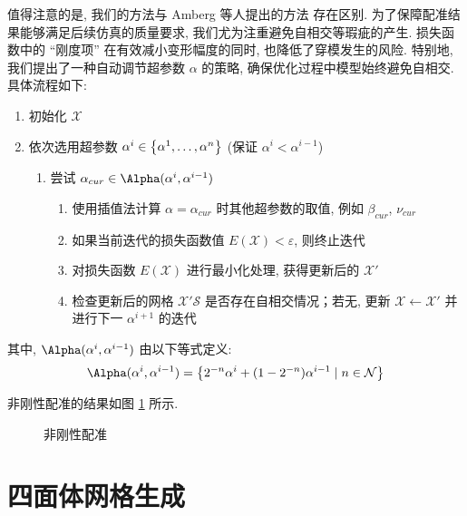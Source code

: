 值得注意的是, 我们的方法与 Amberg 等人提出的方法 \cite{ambergOptimalStepNonrigid2007} 存在区别.
为了保障配准结果能够满足后续仿真的质量要求, 我们尤为注重避免自相交等瑕疵的产生.
损失函数中的 ``刚度项'' 在有效减小变形幅度的同时, 也降低了穿模发生的风险.
特别地, 我们提出了一种自动调节超参数 $\alpha$ 的策略, 确保优化过程中模型始终避免自相交.
具体流程如下:
\begin{enumerate}
  \item 初始化 $\mathcal{X}$
  \item 依次选用超参数 $\alpha^i \in \Bqty{\alpha^1, \dots, \alpha^n}$ (保证 $\alpha^i < \alpha^{i - 1}$)
        \begin{enumerate}
          \item 尝试 $\alpha_{cur} \in \Alpha(\alpha^i, \alpha^{i - 1})$
                \begin{enumerate}
                  \item 使用插值法计算 $\alpha = \alpha_{cur}$ 时其他超参数的取值, 例如 $\beta_{cur}$, $\nu_{cur}$
                  \item 如果当前迭代的损失函数值 $E(\mathcal{X}) < \varepsilon$, 则终止迭代
                  \item 对损失函数 $E(\mathcal{X})$ 进行最小化处理, 获得更新后的 $\mathcal{X}'$
                  \item 检查更新后的网格 $\mathcal{X}' \mathcal{S}$ 是否存在自相交情况；若无, 更新 $\mathcal{X} \leftarrow \mathcal{X}'$ 并进行下一 $\alpha^{i + 1}$ 的迭代
                \end{enumerate}
        \end{enumerate}
\end{enumerate}
其中, $\Alpha(\alpha^i, \alpha^{i - 1})$ 由以下等式定义:
\begin{equation}
  \Alpha(\alpha^i, \alpha^{i - 1}) = \Bqty{2^{-n} \alpha^i + (1 - 2^{-n}) \alpha^{i - 1} \mid n \in \mathcal{N}}
\end{equation}

非刚性配准的结果如图 \ref{fig:registration} 所示.

\begin{figure}
  \centering
  \caption{非刚性配准}
  \label{fig:registration}
\end{figure}

\section{四面体网格生成}

